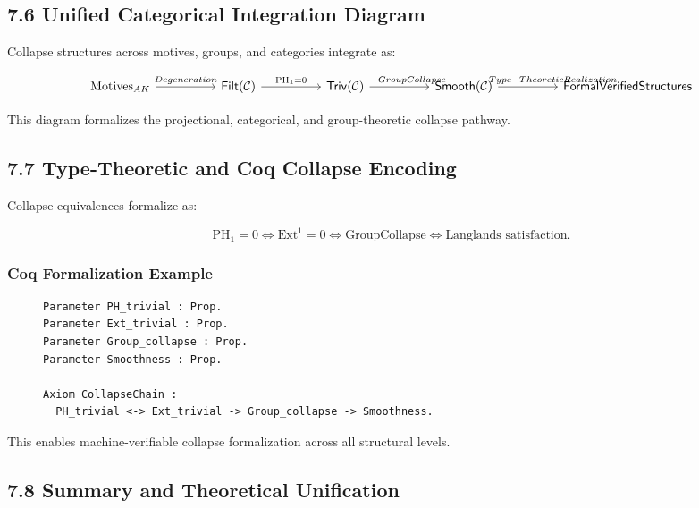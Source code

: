 \documentclass[11pt]{article}
\begin{document}
\subsection*{7.6 Unified Categorical Integration Diagram}

Collapse structures across motives, groups, and categories integrate as:

\[
\begin{tikzcd}[column sep=huge]
\mathrm{Motives}_{AK} \arrow[r, "Degeneration"]
& \mathsf{Filt}(\mathcal{C}) \arrow[r, "\mathrm{PH}_1 = 0"]
& \mathsf{Triv}(\mathcal{C}) \arrow[r, "\hspace{2em}Group Collapse"]
& \mathsf{Smooth}(\mathcal{C}) \arrow[r, "\hspace{4em}Type-Theoretic Realization"]
& \mathsf{Formal Verified Structures}
\end{tikzcd}
\]

This diagram formalizes the projectional, categorical, and group-theoretic collapse pathway.

\subsection*{7.7 Type-Theoretic and Coq Collapse Encoding}

Collapse equivalences formalize as:

\[
\mathrm{PH}_1 = 0 \iff \mathrm{Ext}^1 = 0 \iff \text{GroupCollapse} \iff \text{Langlands satisfaction}.
\]

\subsubsection*{Coq Formalization Example}

\begin{figure}[h]
\centering
\begin{lstlisting}[language=Coq, caption=Collapse Typing and Group Collapse Schema]
Parameter PH_trivial : Prop.
Parameter Ext_trivial : Prop.
Parameter Group_collapse : Prop.
Parameter Smoothness : Prop.

Axiom CollapseChain :
  PH_trivial <-> Ext_trivial -> Group_collapse -> Smoothness.
\end{lstlisting}
\end{figure}


This enables machine-verifiable collapse formalization across all structural levels.

\subsection*{7.8 Summary and Theoretical Unification}
\end{document}
